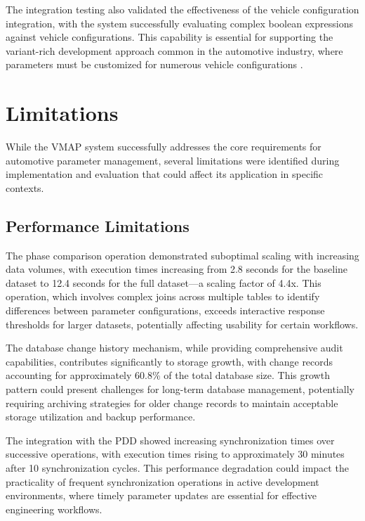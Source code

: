 The integration testing also validated the effectiveness of the vehicle configuration integration, with the system successfully evaluating complex boolean expressions against vehicle configurations. This capability is essential for supporting the variant-rich development approach common in the automotive industry, where parameters must be customized for numerous vehicle configurations \cite{staron2021autosar}.

\section{Limitations}
\label{sec:limitations}

While the \ac{VMAP} system successfully addresses the core requirements for automotive parameter management, several limitations were identified during implementation and evaluation that could affect its application in specific contexts.

\subsection{Performance Limitations}
\label{subsec:performance-limitations}

The phase comparison operation demonstrated suboptimal scaling with increasing data volumes, with execution times increasing from 2.8 seconds for the baseline dataset to 12.4 seconds for the full dataset—a scaling factor of 4.4x. This operation, which involves complex joins across multiple tables to identify differences between parameter configurations, exceeds interactive response thresholds for larger datasets, potentially affecting usability for certain workflows.

The database change history mechanism, while providing comprehensive audit capabilities, contributes significantly to storage growth, with change records accounting for approximately 60.8\% of the total database size. This growth pattern could present challenges for long-term database management, potentially requiring archiving strategies for older change records to maintain acceptable storage utilization and backup performance.

The integration with the \ac{PDD} showed increasing synchronization times over successive operations, with execution times rising to approximately 30 minutes after 10 synchronization cycles. This performance degradation could impact the practicality of frequent synchronization operations in active development environments, where timely parameter updates are essential for effective engineering workflows.

